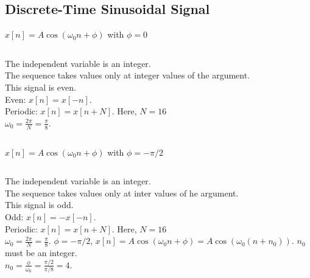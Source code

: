 \subsection{Discrete-Time Sinusoidal Signal}

\begin{frame}[plain]{$x[n] = A\cos(\omega_0n+\phi)$ with $\phi = 0$}
    {
        \begin{columns}[t]
            {
                \centering
                
            }
            {
                \noindent The independent variable is an integer.\\
                The sequence takes values only at integer values of the argument.\\
                This signal is \alert{even}. \\[12pt]
                Even: $x[n] = x[-n]$.\\
                Periodic: $x[n] = x[n+N]$. Here, $N=16$\\
                $\omega_0 = \frac{2\pi}{N} = \frac{\pi}{8}$.


            }
        \end{columns}
    }
\end{frame}


\begin{frame}[plain]{$x[n] = A\cos(\omega_0n+\phi)$ with $\phi = -\pi/2$}
    {
        \begin{columns}[t]
            {
                \centering
                
            }
            {
                \noindent The independent variable is an integer.\\
                The sequence takes values only at inter values of he argument.\\
                This signal is \alert{odd}. \\[12pt]
                Odd: $x[n] = -x[-n]$.\\
                Periodic: $x[n] = x[n+N]$. Here, $N=16$\\
                $\omega_0 = \frac{2\pi}{N} = \frac{\pi}{8}$.
                $\phi= -\pi/2$, $x[n] = A\cos(\omega_0n+\phi) = A\cos(\omega_0(n+n_0))$. $n_0$ must be an integer.\\
                $n_0 = \frac{\phi}{\omega_0} = \frac{\pi/2}{\pi/8} = 4$.


            }
        \end{columns}
    }
\end{frame}




